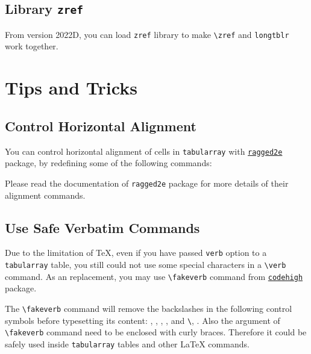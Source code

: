 \documentclass[oneside]{book}
\begin{document}
\section{Library \texttt{zref}}

From version 2022D, you can load \verb!zref! library
to make \verb!\zref! and \verb!longtblr! work together.

\chapter{Tips and Tricks}

\section{Control Horizontal Alignment}

You can control horizontal alignment of cells in \texttt{tabularray} with
\href{https://www.ctan.org/pkg/ragged2e}{\texttt{ragged2e}} package,
by redefining some of the following commands:

\begin{codehigh}
\RenewDocumentCommand\TblrAlignBoth{}{\justifying}
\RenewDocumentCommand\TblrAlignLeft{}{\RaggedRight}
\RenewDocumentCommand\TblrAlignCenter{}{\Centering}
\RenewDocumentCommand\TblrAlignRight{}{\RaggedLeft}
\end{codehigh}

Please read the documentation of \texttt{ragged2e} package for more details of
their alignment commands.

\section{Use Safe Verbatim Commands}%
\label{sec:fakeverb}

Due to the limitation of TeX, even if you have passed \texttt{verb} option to a
\texttt{tabularray} table, you still could not use some special characters in a
\verb!\verb! command. As an replacement, you may use \verb|\fakeverb| command from \href{https://www.ctan.org/pkg/codehigh}{\texttt{codehigh}} package.

The \verb|\fakeverb| command will remove the backslashes in the following control symbols before
typesetting its content: \fakeverb{\\\\}, \fakeverb{\\\{}, \fakeverb{\\\}}, \fakeverb{\\\#}, \fakeverb{\\\^} and \texttt{\textbackslash\textvisiblespace}, \fakeverb{\\\%}.
Also the argument of \verb|\fakeverb| command need to be enclosed with curly braces.
Therefore it could be safely used inside \verb|tabularray| tables and other LaTeX commands.
\end{document}
